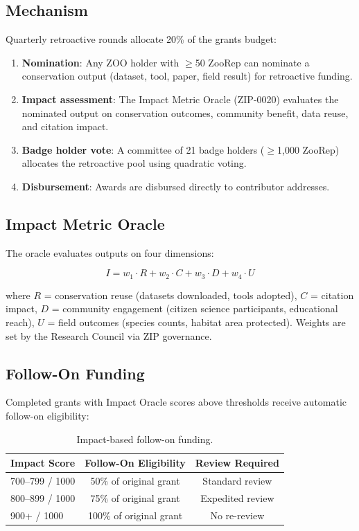 \documentclass[11pt,letterpaper]{article}
\begin{document}
\subsection{Mechanism}

Quarterly retroactive rounds allocate 20\% of the grants budget:

\begin{enumerate}
    \item \textbf{Nomination}: Any ZOO holder with $\geq$50 ZooRep can nominate a conservation output (dataset, tool, paper, field result) for retroactive funding.
    \item \textbf{Impact assessment}: The Impact Metric Oracle (ZIP-0020) evaluates the nominated output on conservation outcomes, community benefit, data reuse, and citation impact.
    \item \textbf{Badge holder vote}: A committee of 21 badge holders ($\geq$1{,}000 ZooRep) allocates the retroactive pool using quadratic voting.
    \item \textbf{Disbursement}: Awards are disbursed directly to contributor addresses.
\end{enumerate}

\subsection{Impact Metric Oracle}

The oracle evaluates outputs on four dimensions:

\begin{equation}
    I = w_1 \cdot R + w_2 \cdot C + w_3 \cdot D + w_4 \cdot U
\end{equation}

where $R$ = conservation reuse (datasets downloaded, tools adopted), $C$ = citation impact, $D$ = community engagement (citizen science participants, educational reach), $U$ = field outcomes (species counts, habitat area protected). Weights are set by the Research Council via ZIP governance.

\subsection{Follow-On Funding}

Completed grants with Impact Oracle scores above thresholds receive automatic follow-on eligibility:

\begin{table}[h]
\centering
\caption{Impact-based follow-on funding.}
\label{tab:followon}
\begin{tabular}{lcc}
\toprule
\textbf{Impact Score} & \textbf{Follow-On Eligibility} & \textbf{Review Required} \\
\midrule
700--799 / 1000 & 50\% of original grant & Standard review \\
800--899 / 1000 & 75\% of original grant & Expedited review \\
900+ / 1000 & 100\% of original grant & No re-review \\
\bottomrule
\end{tabular}
\end{table}
\end{document}
